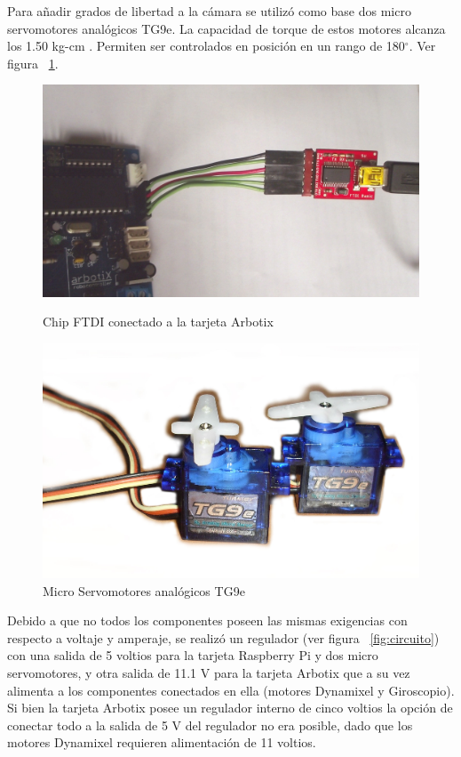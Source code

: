 Para añadir grados de libertad a la c\'amara se utilizó como base dos micro servomotores anal\'ogicos TG9e. La capacidad de torque de estos motores alcanza los 1.50 kg-cm \cite{microservo}. Permiten ser controlados en posición en un rango de 180$^{\circ}$. Ver figura ~\ref{fig:Servo}.   

\begin{figure}[hbtp]
\centering
\includegraphics[scale=0.06]{imagenes/DSCF1162.jpg}
\caption{Chip FTDI conectado a la tarjeta Arbotix}
\label{fig:ftdi}
\centering
\includegraphics[scale=0.09]{imagenes/servosTg9B.jpg}
\caption{Micro Servomotores analógicos TG9e}
\label{fig:Servo}
\end{figure}

Debido a que no todos los componentes poseen las mismas exigencias con respecto a voltaje y amperaje, se realizó un regulador (ver figura ~\ref{fig:circuito}) con una salida de 5 voltios para la tarjeta Raspberry Pi y dos micro servomotores, y otra salida de 11.1 V para la tarjeta Arbotix que a su vez alimenta a los componentes conectados en ella (motores Dynamixel y Giroscopio). Si bien la tarjeta Arbotix posee un regulador interno de cinco voltios la opción de conectar todo a la salida de 5 V del regulador no era posible, dado que los motores Dynamixel requieren alimentación de 11 voltios.

